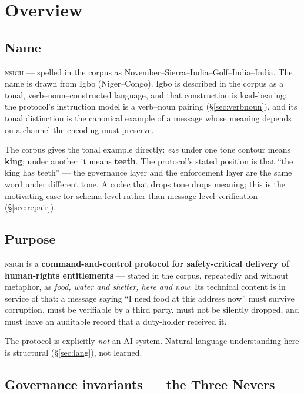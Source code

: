 \documentclass[11pt,a4paper]{article}
\newcommand{\NSIGII}{\textsc{nsigii}}
\begin{document}
\section{Overview}

\subsection{Name}

\NSIGII{} --- spelled in the corpus as November--Sierra--India--Golf--India--India.
The name is drawn from Igbo (Niger--Congo). Igbo is described in the corpus as a
tonal, verb--noun--constructed language, and that construction is load-bearing:
the protocol's instruction model is a verb--noun pairing (\S\ref{sec:verbnoun}),
and its tonal distinction is the canonical example of a message whose meaning
depends on a channel the encoding must preserve.

The corpus gives the tonal example directly: \emph{eze} under one tone contour
means \textbf{king}; under another it means \textbf{teeth}. The protocol's
stated position is that ``the king has teeth'' --- the governance layer and the
enforcement layer are the same word under different tone. A codec that drops
tone drops meaning; this is the motivating case for schema-level rather than
message-level verification (\S\ref{sec:repair}).

\subsection{Purpose}

\NSIGII{} is a \textbf{command-and-control protocol for safety-critical delivery
of human-rights entitlements} --- stated in the corpus, repeatedly and without
metaphor, as \emph{food, water and shelter, here and now}. Its technical content
is in service of that: a message saying ``I need food at this address now'' must
survive corruption, must be verifiable by a third party, must not be silently
dropped, and must leave an auditable record that a duty-holder received it.

The protocol is explicitly \emph{not} an AI system. Natural-language
understanding here is structural (\S\ref{sec:lang}), not learned.

\subsection{Governance invariants --- the Three Nevers}
\label{sec:nevers}
\end{document}

